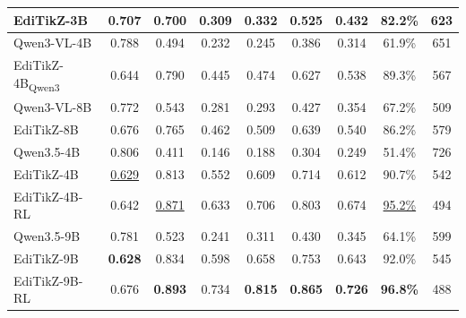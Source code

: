 \begin{table}[t]
\begin{tabular}{lccccc:c:cc}
EdiTikZ-3B
& 0.707 & 0.700 & 0.309 & 0.332 & 0.525
& 0.432
& 82.2\% & 623 \\

\midrule

Qwen3-VL-4B
& 0.788 & 0.494 & 0.232 & 0.245 & 0.386
& 0.314
& 61.9\% & 651 \\

EdiTikZ-4B\textsubscript{Qwen3}
& 0.644 & 0.790 & 0.445 & 0.474 & 0.627
& 0.538
& 89.3\% & 567 \\

\midrule

Qwen3-VL-8B
& 0.772 & 0.543 & 0.281 & 0.293 & 0.427
& 0.354
& 67.2\% & 509 \\

EdiTikZ-8B
& 0.676 & 0.765 & 0.462 & 0.509 & 0.639
& 0.540
& 86.2\% & 579 \\

\midrule

Qwen3.5-4B
& 0.806 & 0.411 & 0.146 & 0.188 & 0.304
& 0.249
& 51.4\% & 726 \\

EdiTikZ-4B
& \underline{0.629} & 0.813 & 0.552 & 0.609 & 0.714
& 0.612
& 90.7\% & 542 \\

EdiTikZ-4B-RL
& 0.642 & \underline{0.871} & 0.633 & 0.706 & 0.803
& 0.674
& \underline{95.2\%} & 494 \\

\midrule

Qwen3.5-9B
& 0.781 & 0.523 & 0.241 & 0.311 & 0.430
& 0.345
& 64.1\% & 599 \\

EdiTikZ-9B
& \textbf{0.628} & 0.834 & 0.598 & 0.658 & 0.753
& 0.643
& 92.0\% & 545 \\

EdiTikZ-9B-RL
& 0.676 & \textbf{0.893} & 0.734 & \textbf{0.815} & \textbf{0.865}
& \textbf{0.726}
& \textbf{96.8\%} & 488 \\

\bottomrule
\end{tabular}
\end{table}